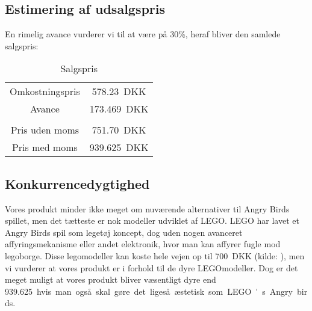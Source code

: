 \subsection{Estimering af udsalgspris}
En rimelig avance vurderer vi til at være på 30\%, heraf bliver den samlede salgspris:
\begin{table}[H] 
	\caption{Salgspris} %
	\label{tab:salg}
	\centering
		\begin{tabular}{c c} 
		\hline\hline
			Omkostningspris & \SI{578.23}{DKK}\\ 
			Avance & \SI{173.469}{DKK}\\
			\hline \\
			Pris uden moms & \SI{751.70}{DKK} \\
			Pris med moms & \SI{939.625}{DKK} \\[1ex] %
		\hline %
	\end{tabular}
\end{table}
\subsection{Konkurrencedygtighed}
Vores produkt minder ikke meget om nuværende alternativer til Angry Birds spillet, men det tætteste er nok modeller udviklet af LEGO.
LEGO har lavet et Angry Birds spil som legetøj koncept, dog uden nogen avanceret affyringsmekanisme eller andet elektronik, hvor man kan affyrer fugle mod legoborge. Disse legomodeller kan koste hele vejen op til \SI{700}{DKK} (kilde: \cite{price:legoBird}), men vi vurderer at vores produkt er i forhold til de dyre LEGOmodeller. Dog er det meget muligt at vores produkt bliver væsentligt dyre end \SI{939.625} hvis man også skal gøre det ligeså æstetisk som LEGO's Angry birds.
